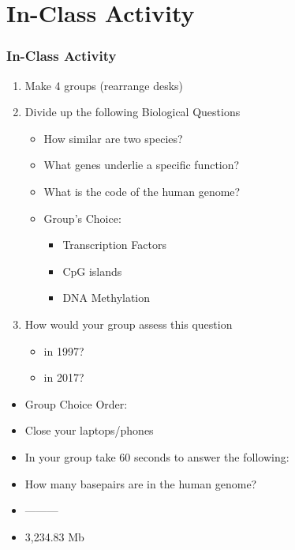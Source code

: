 \documentclass[14pt]{beamer}
\begin{document}
\section{In-Class Activity}

\begin{frame}
\frametitle{In-Class Activity}
	\begin{enumerate}
	\item<1-> Make 4 groups (rearrange desks)
	\item<2-> Divide up the following Biological Questions
		\begin{itemize}
			\item<3-> How similar are two species?
			\item<4-> What genes underlie a specific function?
			\item<5-> What is the code of the human genome?
			\item<6-> Group's Choice:
			\begin{itemize}
			\item Transcription Factors
			\item CpG islands
			\item DNA Methylation
			\end{itemize}
		\end{itemize}
	\item<7-> How would your group assess this question 
	\begin{itemize}
		\item in 1997?
		\item in 2017?
	\end{itemize}
	\end{enumerate}
\end{frame}
\begin{frame}
	\begin{itemize}
		\item<+-> {\Large Group Choice Order:}
		\item<+-> Close your laptops/phones
		\item<+-> In your group take 60 seconds to answer the following:
		\item<+-> How many basepairs are in the human genome?
		\item<+-> ---------
		\item<+-> 3,234.83 Mb
	\end{itemize}
\end{frame}
\end{document}
